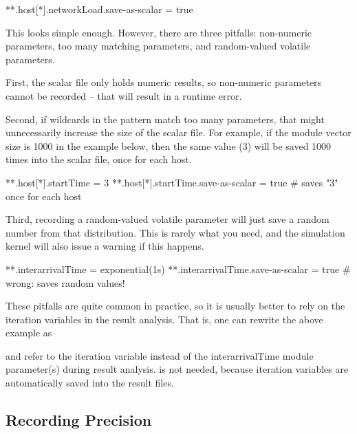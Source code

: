 \begin{inifile}
**.host[*].networkLoad.save-as-scalar = true
\end{inifile}

This looks simple enough. However, there are three pitfalls:
non-numeric parameters, too many matching parameters, and
random-valued volatile parameters.

First, the scalar file only holds numeric results, so non-numeric
parameters cannot be recorded -- that will result in a runtime
error.

Second, if wildcards in the pattern match too many parameters, that
might unnecessarily increase the size of the scalar file. For example,
if the  module vector size is 1000 in the example below, then the
same value (3) will be saved 1000 times into the scalar file, once for
each host.

\begin{inifile}
**.host[*].startTime = 3
**.host[*].startTime.save-as-scalar = true  # saves "3" once for each host
\end{inifile}

Third, recording a random-valued volatile parameter will just save a
random number from that distribution. This is rarely what you need, and
the simulation kernel will also issue a warning if this happens.

\begin{inifile}
**.interarrivalTime = exponential(1s)
**.interarrivalTime.save-as-scalar = true  # wrong: saves random values!
\end{inifile}

These pitfalls are quite common in practice, so it is usually better
to rely on the iteration variables in the result analysis.
That is, one can rewrite the above example as


and refer to the  iteration variable instead of the
interarrivalTime module parameter(s) during result analysis.
 is not needed, because iteration variables are
automatically saved into the result files.


\subsection{Recording Precision}
\label{sec:outputfile-precision}

